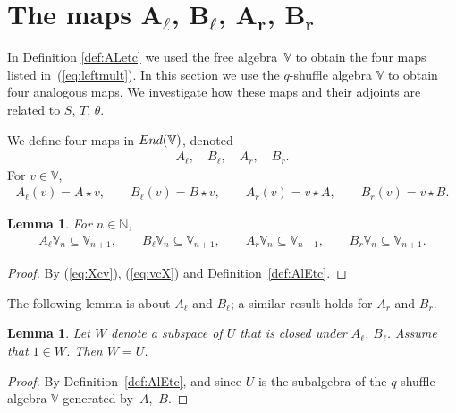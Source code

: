 \documentclass[11pt]{article}
\numberwithin{equation}{section}
\numberwithin{equation}{section}
\newtheorem{Lemma}[Theorem]{Lemma}
\begin{document}
{\section[The maps $A_{\ell}$, $B_{\ell}$, $A_{r}$, $B_{r}$]{The maps $\boldsymbol{A_{\ell}}$, $\boldsymbol{B_{\ell}}$, $\boldsymbol{A_{r}}$, $\boldsymbol{B_{r}}$}\label{section7}

In Definition \ref{def:ALetc} we used the free algebra~$\mathbb V$ to obtain the four maps listed in~(\ref{eq:leftmult}). In this section we use the $q$-shuffle algebra $\mathbb V$ to obtain
four analogous maps. We investigate how these maps and their adjoints are related to $S$, $T$, $\theta$.

\begin{Definition}\label{def:AlEtc}We define four maps in ${\rm End}(\mathbb V)$, denoted
\begin{gather}\label{eq:alblarbr}
A_{\ell}, \quad
B_{\ell}, \quad
A_{r}, \quad
B_{r}.
\end{gather}
For $v \in \mathbb V$,
\begin{gather*}
A_{\ell}(v) = A\star v, \qquad
B_{\ell}(v) = B\star v, \qquad
A_{r}(v) = v \star A, \qquad
B_{r}(v) = v \star B.
\end{gather*}
\end{Definition}

\begin{Lemma}\label{lem:ABlRaise2} For $n \in \mathbb N$,
\begin{gather*}
A_{\ell} \mathbb V_n \subseteq \mathbb V_{n+1},
\qquad
B_{\ell} \mathbb V_n \subseteq \mathbb V_{n+1},
\qquad
A_{r} \mathbb V_n \subseteq \mathbb V_{n+1},
\qquad
B_{r} \mathbb V_n \subseteq \mathbb V_{n+1}.
\end{gather*}
\end{Lemma}
\begin{proof} By (\ref{eq:Xcv}), (\ref{eq:vcX}) and Definition~\ref{def:AlEtc}.
\end{proof}

The following lemma is about $A_\ell$ and $B_{\ell}$; a similar result holds for
 $A_r$ and $B_r$.
\begin{Lemma}\label{lem:ABirred2} Let $W$ denote a subspace of $U$ that is closed under $A_\ell$, $B_{\ell}$. Assume that $1 \in W$. Then $W=U$.
\end{Lemma}
\begin{proof} By Definition~\ref{def:AlEtc}, and since $U$ is the subalgebra of the $q$-shuffle algebra $\mathbb V$ generated by~$A$,~$B$.
\end{proof}

}
\end{document}

